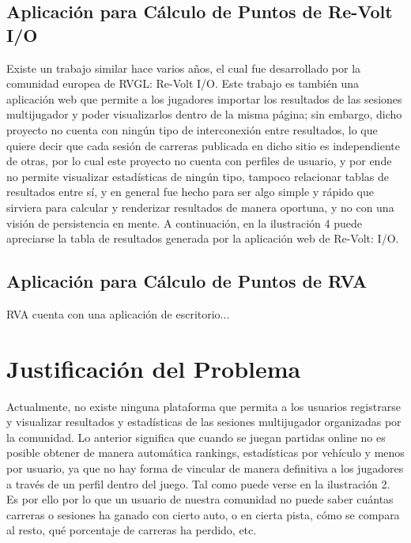 \subsection{Aplicación para Cálculo de Puntos de Re-Volt I/O}
Existe un trabajo similar hace varios años, el cual fue desarrollado por la comunidad europea de RVGL: Re-Volt I/O. Este trabajo es también una aplicación web que permite a los jugadores importar los resultados de las sesiones multijugador y poder visualizarlos dentro de la misma página; sin embargo, dicho proyecto no cuenta con ningún tipo de interconexión entre resultados, lo que quiere decir que cada sesión de carreras publicada en dicho sitio es independiente de otras, por lo cual este proyecto no cuenta con perfiles de usuario, y por ende no permite visualizar estadísticas de ningún tipo, tampoco relacionar tablas de resultados entre sí, y en general fue hecho para ser algo simple y rápido que sirviera para calcular y renderizar resultados de manera oportuna, y no con una visión de persistencia en mente. A continuación, en la ilustración 4 puede apreciarse la tabla de resultados generada por la aplicación web de Re-Volt: I/O.

\subsection{Aplicación para Cálculo de Puntos de RVA}
RVA cuenta con una aplicación de escritorio...

\section{Justificación del Problema}
Actualmente, no existe ninguna plataforma que permita a los usuarios registrarse y visualizar resultados y estadísticas de las sesiones multijugador organizadas por la comunidad. Lo anterior significa que cuando se juegan partidas online no es posible obtener de manera automática rankings, estadísticas por vehículo y menos por usuario, ya que no hay forma de vincular de manera definitiva a los jugadores a través de un perfil dentro del juego. Tal como puede verse en la ilustración 2. Es por ello por lo que un usuario de nuestra comunidad no puede saber cuántas carreras o sesiones ha ganado con cierto auto, o en cierta pista, cómo se compara al resto, qué porcentaje de carreras ha perdido, etc.



